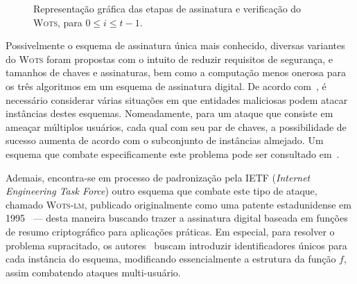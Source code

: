 \documentclass[12pt]{report}
\begin{document}
\begin{figure}[ht]
  \centering
  \caption{Representação gráfica das etapas de assinatura e verificação do \textsc{Wots},
    para $0 \leq i \leq t - 1$.}
  \label{fig:5}
\end{figure}

Possivelmente o esquema de assinatura única mais conhecido, diversas variantes do
\textsc{Wots} foram propostas com o intuito de reduzir requisitos de segurança,
e tamanhos de chaves e assinaturas, bem como a computação menos onerosa para os
três algoritmos em um esquema de assinatura digital. De acordo
com~\cite{LafrancePhilip2017}, é necessário considerar várias situações em que
entidades maliciosas podem atacar instâncias destes esquemas. Nomeadamente, para
um ataque que consiste em ameaçar múltiplos usuários, cada qual com seu par de
chaves, a possibilidade de sucesso aumenta de acordo com o subconjunto de
instâncias almejado. Um esquema que combate especificamente este problema pode
ser consultado em~\cite{Hulsing:2016:MMA:3081852.3081871}.

Ademais, encontra-se em processo de padronização pela IETF (\emph{Internet Engineering Task
Force}) outro esquema que combate este tipo de ataque, chamado \textsc{Wots-lm}, publicado
originalmente como uma patente estadunidense em 1995~\cite{lm-patent} --- desta maneira
buscando trazer a assinatura digital baseada em funções de resumo criptográfico
para aplicações práticas. Em especial, para resolver o problema supracitado, os
autores~\cite{mcgrew-hash-sigs-08} buscam introduzir identificadores únicos para cada instância do
esquema, modificando essencialmente a estrutura da função $f$, assim combatendo
ataques multi-usuário.
\end{document}
